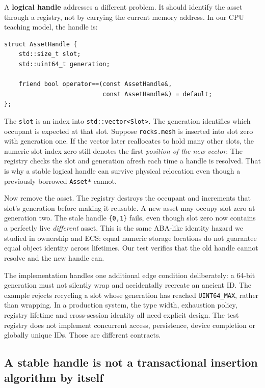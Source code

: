 A \textbf{logical handle} addresses a different problem. It should identify the asset through a registry, not by carrying the current memory address. In our CPU teaching model, the handle is:

\begin{verbatim}
struct AssetHandle {
    std::size_t slot;
    std::uint64_t generation;

    friend bool operator==(const AssetHandle&,
                           const AssetHandle&) = default;
};
\end{verbatim}

The \texttt{slot} is an index into \texttt{std::vector\textless{}Slot\textgreater{}}. The generation identifies which occupant is expected at that slot. Suppose \texttt{rocks.mesh} is inserted into slot zero with generation one. If the vector later reallocates to hold many other slots, the numeric slot index zero still denotes the first \emph{position of the new vector}. The registry checks the slot and generation afresh each time a handle is resolved. That is why a stable logical handle can survive physical relocation even though a previously borrowed \texttt{Asset*} cannot.

Now remove the asset. The registry destroys the occupant and increments that slot's generation before making it reusable. A new asset may occupy slot zero at generation two. The stale handle \texttt{\{0,1\}} fails, even though slot zero now contains a perfectly live \emph{different} asset. This is the same ABA-like identity hazard we studied in ownership and ECS: equal numeric storage locations do not guarantee equal object identity across lifetimes. Our test verifies that the old handle cannot resolve and the new handle can.

The implementation handles one additional edge condition deliberately: a 64-bit generation must not silently wrap and accidentally recreate an ancient ID. The example rejects recycling a slot whose generation has reached \texttt{UINT64\_MAX}, rather than wrapping. In a production system, the type width, exhaustion policy, registry lifetime and cross-session identity all need explicit design. The test registry does not implement concurrent access, persistence, device completion or globally unique IDs. Those are different contracts.

\subsection{A stable handle is not a transactional insertion algorithm by itself}\label{01-foundations-i-ch006-a-stable-handle-is-not-a-transactional-insertion-algorithm-by-itself}

